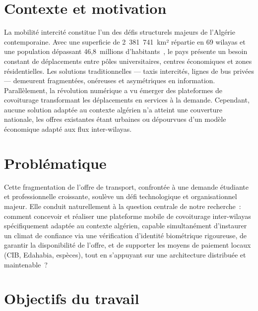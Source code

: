 
\section*{Contexte et motivation}

La mobilité intercité constitue l'un des défis structurels majeurs de l'Algérie contemporaine. Avec une superficie de 2~381~741~km² répartie en 69 wilayas et une population dépassant 46,8~millions d'habitants~\cite{ons_2024}, le pays présente un besoin constant de déplacements entre pôles universitaires, centres économiques et zones résidentielles. Les solutions traditionnelles --- taxis intercités, lignes de bus privées --- demeurent fragmentées, onéreuses et asymétriques en information. Parallèlement, la révolution numérique a vu émerger des plateformes de covoiturage transformant les déplacements en services à la demande. Cependant, aucune solution adaptée au contexte algérien n'a atteint une couverture nationale, les offres existantes étant urbaines ou dépourvues d'un modèle économique adapté aux flux inter-wilayas.

\section*{Problématique}

Cette fragmentation de l'offre de transport, confrontée à une demande étudiante et professionnelle croissante, soulève un défi technologique et organisationnel majeur. Elle conduit naturellement à la question centrale de notre recherche~: comment concevoir et réaliser une plateforme mobile de covoiturage inter-wilayas spécifiquement adaptée au contexte algérien, capable simultanément d'instaurer un climat de confiance via une vérification d'identité biométrique rigoureuse, de garantir la disponibilité de l'offre, et de supporter les moyens de paiement locaux (CIB, Edahabia, espèces), tout en s'appuyant sur une architecture distribuée et maintenable~?

\section*{Objectifs du travail}

